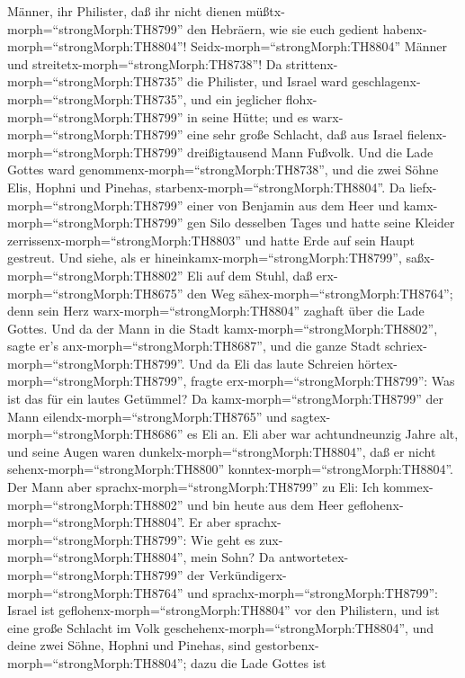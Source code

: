 Männer, ihr Philister, daß ihr nicht dienen
müßtx-morph=``strongMorph:TH8799'' den Hebräern, wie sie euch gedient
habenx-morph=``strongMorph:TH8804''! Seidx-morph=``strongMorph:TH8804''
Männer und streitetx-morph=``strongMorph:TH8738''!  Da
strittenx-morph=``strongMorph:TH8735'' die Philister, und Israel ward
geschlagenx-morph=``strongMorph:TH8735'', und ein jeglicher
flohx-morph=``strongMorph:TH8799'' in seine Hütte; und es
warx-morph=``strongMorph:TH8799'' eine sehr große Schlacht, daß aus
Israel fielenx-morph=``strongMorph:TH8799'' dreißigtausend Mann Fußvolk.
 Und die Lade Gottes ward
genommenx-morph=``strongMorph:TH8738'', und die zwei Söhne Elis, Hophni
und Pinehas, starbenx-morph=``strongMorph:TH8804''.  Da
liefx-morph=``strongMorph:TH8799'' einer von Benjamin aus dem Heer und
kamx-morph=``strongMorph:TH8799'' gen Silo desselben Tages und hatte
seine Kleider zerrissenx-morph=``strongMorph:TH8803'' und hatte Erde auf
sein Haupt gestreut.  Und siehe, als er
hineinkamx-morph=``strongMorph:TH8799'',
saßx-morph=``strongMorph:TH8802'' Eli auf dem Stuhl, daß
erx-morph=``strongMorph:TH8675'' den Weg
sähex-morph=``strongMorph:TH8764''; denn sein Herz
warx-morph=``strongMorph:TH8804'' zaghaft über die Lade Gottes. Und da
der Mann in die Stadt kamx-morph=``strongMorph:TH8802'', sagte er's
anx-morph=``strongMorph:TH8687'', und die ganze Stadt
schriex-morph=``strongMorph:TH8799''.  Und da Eli das laute
Schreien hörtex-morph=``strongMorph:TH8799'', fragte
erx-morph=``strongMorph:TH8799'': Was ist das für ein lautes Getümmel?
Da kamx-morph=``strongMorph:TH8799'' der Mann
eilendx-morph=``strongMorph:TH8765'' und
sagtex-morph=``strongMorph:TH8686'' es Eli an.  Eli aber
war achtundneunzig Jahre alt, und seine Augen waren
dunkelx-morph=``strongMorph:TH8804'', daß er nicht
sehenx-morph=``strongMorph:TH8800''
konntex-morph=``strongMorph:TH8804''.  Der Mann aber
sprachx-morph=``strongMorph:TH8799'' zu Eli: Ich
kommex-morph=``strongMorph:TH8802'' und bin heute aus dem Heer
geflohenx-morph=``strongMorph:TH8804''. Er aber
sprachx-morph=``strongMorph:TH8799'': Wie geht es
zux-morph=``strongMorph:TH8804'', mein Sohn?  Da
antwortetex-morph=``strongMorph:TH8799'' der
Verkündigerx-morph=``strongMorph:TH8764'' und
sprachx-morph=``strongMorph:TH8799'': Israel ist
geflohenx-morph=``strongMorph:TH8804'' vor den Philistern, und ist eine
große Schlacht im Volk geschehenx-morph=``strongMorph:TH8804'', und
deine zwei Söhne, Hophni und Pinehas, sind
gestorbenx-morph=``strongMorph:TH8804''; dazu die Lade Gottes ist

